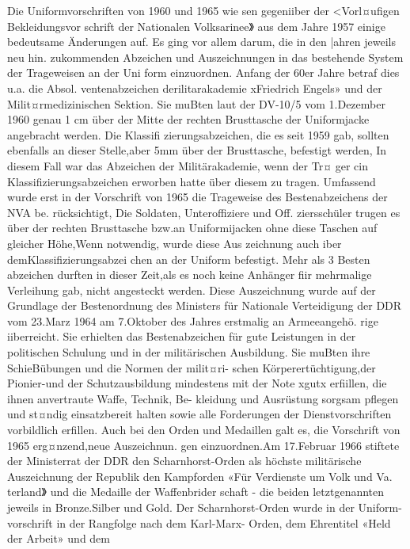 

Die Uniformvorschriften von 1960 und 1965 wie
sen gegeniiber der <Vorl¤ufigen Bekleidungsvor
schrift der Nationalen Volksarinee》 aus dem Jahre
1957 einige bedeutsame Änderungen auf. Es ging
vor allem darum, die in den |ahren jeweils neu hin.
zukommenden Abzeichen und Auszeichnungen in
das bestehende System der Trageweisen an der Uni
form einzuordnen.
Anfang der 60er Jahre betraf dies u.a. die Absol.
ventenabzeichen derilitarakademie xFriedrich
Engels» und der Milit¤rmedizinischen Sektion. Sie
muBten laut der DV-10/5 vom 1.Dezember 1960
genau 1 cm über der Mitte der rechten Brusttasche
der Uniformjacke angebracht werden. Die Klassifi
zierungsabzeichen, die es seit 1959 gab, sollten
ebenfalls an dieser Stelle,aber 5mm über der
Brusttasche, befestigt werden, In diesem Fall war
das Abzeichen der Militärakademie, wenn der Tr¤
ger cin Klassifizierungsabzeichen erworben hatte
über diesem zu tragen.
Umfassend wurde erst in der Vorschrift von 1965
die Trageweise des Bestenabzeichens der NVA be.
rücksichtigt, Die Soldaten, Unteroffiziere und Off.
ziersschüler trugen es über der rechten Brusttasche
bzw.an Uniformijacken ohne diese Taschen auf
gleicher Höhe,Wenn notwendig, wurde diese Aus
zeichnung auch iber demKlassifizierungsabzei
chen an der Uniform befestigt. Mehr als 3 Besten
abzeichen durften in dieser Zeit,als es noch keine
Anhänger fiir mehrmalige Verleihung gab, nicht
angesteckt werden.
Diese Auszeichnung wurde auf der Grundlage
der Bestenordnung des Ministers für Nationale Verteidigung der DDR vom 23.Marz 1964 am
7.Oktober des Jahres erstmalig an Armeeangehö.
rige iiberreicht. Sie erhielten das Bestenabzeichen
für gute Leistungen in der politischen Schulung
und in der militärischen Ausbildung. Sie muBten
ihre SchieBübungen und die Normen der milit¤ri-
schen Körperertüchtigung,der Pionier-und der
Schutzausbildung mindestens mit der Note xgutx
erfiillen, die ihnen anvertraute Waffe, Technik, Be-
kleidung und Ausrüstung sorgsam pflegen und
st¤ndig einsatzbereit halten sowie alle Forderungen
der Dienstvorschriften vorbildlich erfillen.
Auch bei den Orden und Medaillen galt es, die
Vorschrift von 1965 erg¤nzend,neue Auszeichnun.
gen einzuordnen.Am 17.Februar 1966 stiftete der
Ministerrat der DDR den Scharnhorst-Orden als
höchste militärische Auszeichnung der Republik
den Kampforden «Für Verdienste um Volk und Va.
terland》 und die Medaille der Waffenbrider
schaft - die beiden letztgenannten jeweils in
Bronze.Silber und Gold.
Der Scharnhorst-Orden wurde in der Uniform-
vorschrift in der Rangfolge nach dem Karl-Marx-
Orden, dem Ehrentitel «Held der Arbeit» und dem
